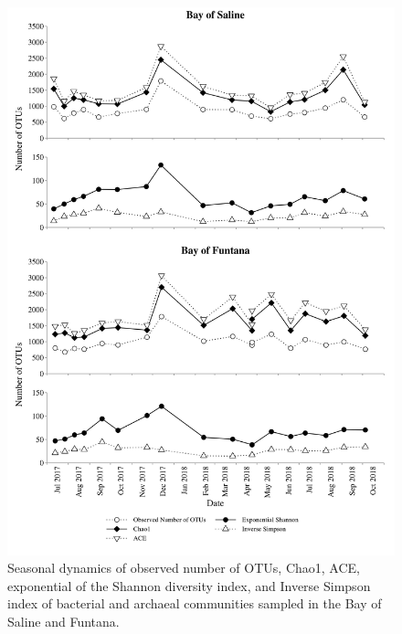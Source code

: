 \documentclass[
  12pt,
]{article}
\begin{document}
\begin{figure}[H]

{\centering \includegraphics[width=0.85\linewidth]{../results/figures/calculators} 

}

\caption{Seasonal dynamics of observed number of OTUs, Chao1, ACE, exponential of the Shannon diversity index, and Inverse Simpson index of bacterial and archaeal communities sampled in the Bay of Saline and Funtana.\label{calculators}}\label{fig:unnamed-chunk-2}
\end{figure}
\end{document}
